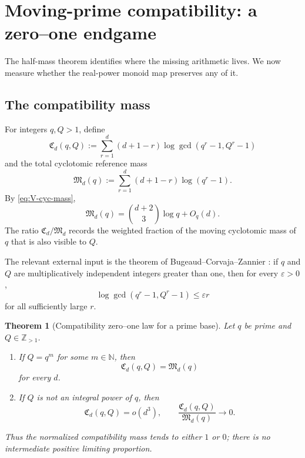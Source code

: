\documentclass[11pt]{article}
\newtheorem{theorem}{Theorem}[section]
\theoremstyle{definition}
\theoremstyle{remark}
\newcommand{\N}{\mathbb N}
\newcommand{\Z}{\mathbb Z}
\begin{document}
\section{Moving-prime compatibility: a zero--one endgame}

The half-mass theorem identifies where the missing arithmetic lives.  We now
measure whether the real-power monoid map preserves any of it.

\subsection{The compatibility mass}

For integers $q,Q>1$, define
\begin{equation}\label{eq:compat-mass}
 \mathfrak C_d(q,Q)
 :=\sum_{r=1}^{d}(d+1-r)
       \log\gcd(q^r-1,Q^r-1)
\end{equation}
and the total cyclotomic reference mass
\begin{equation}\label{eq:reference-mass}
 \mathfrak M_d(q)
 :=\sum_{r=1}^{d}(d+1-r)\log(q^r-1).
\end{equation}
By \eqref{eq:V-cyc-mass},
\begin{equation}\label{eq:M-asymptotic}
 \mathfrak M_d(q)=\binom{d+2}{3}\log q+O_q(d).
\end{equation}
The ratio $\mathfrak C_d/\mathfrak M_d$ records the weighted fraction of the
moving cyclotomic mass of $q$ that is also visible to $Q$.

The relevant external input is the theorem of
Bugeaud--Corvaja--Zannier \cite{BCZ2003}: if $q$ and $Q$ are multiplicatively
independent integers greater than one, then for every $\varepsilon>0$,
\[
 \log\gcd(q^r-1,Q^r-1)\leq\varepsilon r
\]
for all sufficiently large $r$.

\begin{theorem}[Compatibility zero--one law for a prime base]
\label{thm:compat-zero-one}
Let $q$ be prime and $Q\in\Z_{>1}$.
\begin{enumerate}
 \item If $Q=q^m$ for some $m\in\N$, then
 \begin{equation}\label{eq:compat-full}
   \mathfrak C_d(q,Q)=\mathfrak M_d(q)
 \end{equation}
 for every $d$.
 \item If $Q$ is not an integral power of $q$, then
 \begin{equation}\label{eq:compat-zero}
   \mathfrak C_d(q,Q)=o(d^3),
   \qquad
   \frac{\mathfrak C_d(q,Q)}{\mathfrak M_d(q)}\longrightarrow0.
 \end{equation}
\end{enumerate}
Thus the normalized compatibility mass tends to either $1$ or $0$; there is
no intermediate positive limiting proportion.
\end{theorem}
\end{document}
